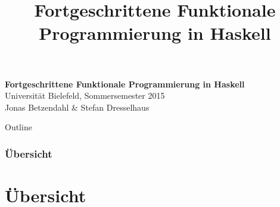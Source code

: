 \documentclass{beamer}
\title{Fortgeschrittene Funktionale Programmierung in Haskell}
\begin{document}
  

  \begin{frame}
  \begin{center}
    \huge\textbf{Fortgeschrittene Funktionale Programmierung in Haskell}\\ \bigskip
    \LARGE Universität Bielefeld, Sommersemester 2015\\ \bigskip
    \large Jonas Betzendahl \& Stefan Dresselhaus
    \end{center}
  \end{frame}

\begin{frame}[allowframebreaks]{Outline}
\frametitle{Übersicht}
\tableofcontents
\end{frame}

\section{Übersicht}

\end{document}
